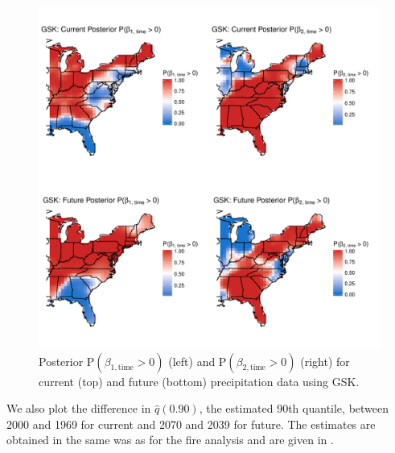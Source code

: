 \documentclass[11pt]{article}
\begin{document}
\begin{figure}[htbp]  %
  \centering
  \includegraphics[width=\linewidth]{plots/precip-gsk-post-betatimepos.pdf}
  \caption{Posterior P$(\beta_{1, \text{time}} > 0)$ (left) and P$(\beta_{2, \text{time}} > 0)$ (right) for current (top) and future (bottom) precipitation data using GSK.}
  \label{ebfig:fire-gskpostbeta1pos}
\end{figure}

We also plot the difference in $\hat{q}(0.90)$, the estimated 90th quantile, between 2000 and 1969 for current and 2070 and 2039 for future.
The estimates are obtained in the same was as for the fire analysis and are given in .
\end{document}
